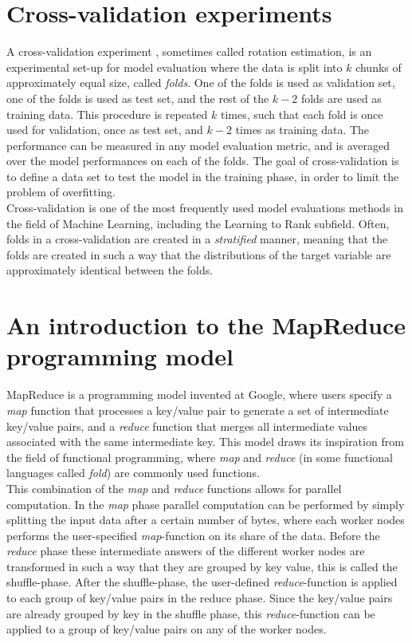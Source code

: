 \section{Cross-validation experiments}
\label{sec:cross_validation}
A cross-validation experiment \cite{kohavi1995}, sometimes called rotation estimation, is an experimental set-up for model evaluation where the data is split into $k$ chunks of approximately equal size, called \emph{folds}. One of the folds is used as validation set, one of the folds is used as test set, and the rest of the $k - 2$ folds are used as training data. This procedure is repeated $k$ times, such that each fold is once used for validation, once as test set, and $k - 2$ times as training data. The performance can be measured in any model evaluation metric, and is averaged over the model performances on each of the folds. The goal of cross-validation is to define a data set to test the model in the training phase, in order to limit the problem of overfitting.\\

Cross-validation is one of the most frequently used model evaluations methods in the field of Machine Learning, including the Learning to Rank subfield. Often, folds in a cross-validation are created in a \emph{stratified} manner, meaning that the folds are created in such a way that the distributions of the target variable are approximately identical between the folds.

\section{An introduction to the MapReduce programming model}
MapReduce \cite{Dean2004} is a programming model invented at Google, where users specify a \emph{map} function that processes a key/value pair to generate a set of intermediate key/value pairs, and a \emph{reduce} function that merges all intermediate values associated with the same intermediate key. This model draws its inspiration from the field of functional programming, where \emph{map} and \emph{reduce} (in some functional languages called \emph{fold}) are commonly used functions.\\

This combination of the \emph{map} and \emph{reduce} functions allows for parallel computation. In the \emph{map} phase parallel computation can be performed by simply splitting the input data after a certain number of bytes, where each worker nodes performs the user-specified \emph{map}-function on its share of the data. Before the \emph{reduce} phase these intermediate answers of the different worker nodes are transformed in such a way that they are grouped by key value, this is called the shuffle-phase. After the shuffle-phase, the user-defined \emph{reduce}-function is applied to each group of key/value pairs in the reduce phase. Since the key/value pairs are already grouped by key in the shuffle phase, this \emph{reduce}-function can be applied to a group of key/value pairs on any of the worker nodes.\\
